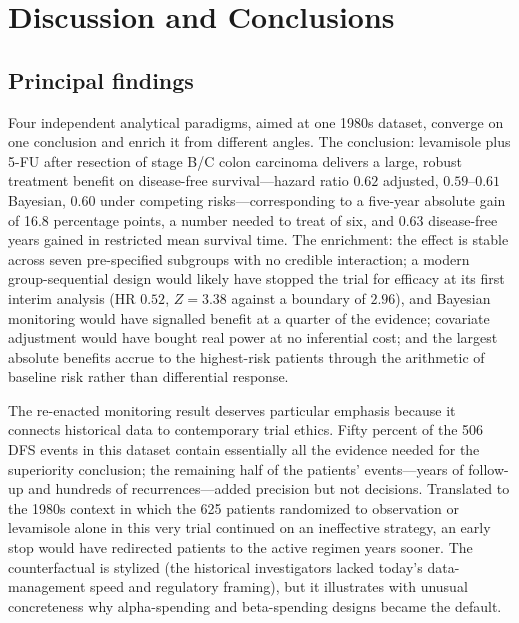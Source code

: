 \section{Discussion and Conclusions}\label{sec:discussion}

\subsection{Principal findings}

Four independent analytical paradigms, aimed at one 1980s dataset,
converge on one conclusion and enrich it from different angles. The
conclusion: levamisole plus 5-FU after resection of stage B/C colon
carcinoma delivers a large, robust treatment benefit on
disease-free survival---hazard ratio $0.62$ adjusted, $0.59$--$0.61$
Bayesian, $0.60$ under competing risks---corresponding to a
five-year absolute gain of 16.8 percentage points, a number needed
to treat of six, and 0.63 disease-free years gained in restricted
mean survival time. The enrichment: the effect is stable across seven
pre-specified subgroups with no credible interaction; a modern
group-sequential design would likely have stopped the trial for
efficacy at its first interim analysis (HR $0.52$, $Z = 3.38$ against
a boundary of $2.96$), and Bayesian monitoring would have signalled
benefit at a quarter of the evidence; covariate adjustment would have
bought real power at no inferential cost; and the largest absolute
benefits accrue to the highest-risk patients through the arithmetic of
baseline risk rather than differential response.

The re-enacted monitoring result deserves particular emphasis because
it connects historical data to contemporary trial ethics. Fifty
percent of the 506 DFS events in this dataset contain essentially all
the evidence needed for the superiority conclusion; the remaining
half of the patients' events---years of follow-up and hundreds of
recurrences---added precision but not decisions. Translated to the
1980s context in which the 625 patients randomized to observation or
levamisole alone in this very trial continued on an ineffective
strategy, an early stop would
have redirected patients to the active regimen years sooner. The
counterfactual is stylized (the historical investigators lacked
today's data-management speed and regulatory framing), but it
illustrates with unusual concreteness why alpha-spending and
beta-spending designs became the default.

